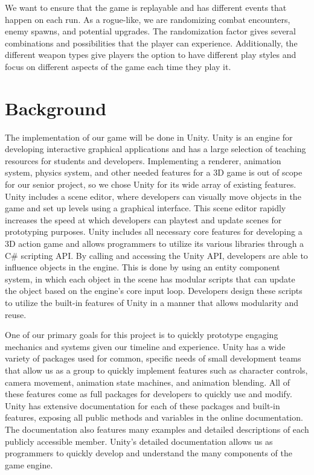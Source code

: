 \documentclass[12pt]{article}
\begin{document}
We want to ensure that the game is replayable and has different events that happen on each run. As a rogue-like, we are randomizing combat encounters, enemy spawns, and potential upgrades. The randomization factor gives several combinations and possibilities that the player can experience. Additionally, the different weapon types give players the option to have different play styles and focus on different aspects of the game each time they play it.


\section{Background}

The implementation of our game will be done in Unity. Unity is an engine for developing interactive graphical applications and has a large selection of teaching resources for students and developers. Implementing a renderer, animation system, physics system, and other needed features for a 3D game is out of scope for our senior project, so we chose Unity for its wide array of existing features. Unity includes a scene editor, where developers can visually move objects in the game and set up levels using a graphical interface. This scene editor rapidly increases the speed at which developers can playtest and update scenes for prototyping purposes. Unity includes all necessary core features for developing a 3D action game and allows programmers to utilize its various libraries through a C\# scripting API. By calling and accessing the Unity API, developers are able to influence objects in the engine. This is done by using an entity component system, in which each object in the scene has modular scripts that can update the object based on the engine's core input loop. Developers design these scripts to utilize the built-in features of Unity in a manner that allows modularity and reuse.

One of our primary goals for this project is to quickly prototype engaging mechanics and systems given our timeline and experience. Unity has a wide variety of packages used for common, specific needs of small development teams that allow us as a group to quickly implement features such as character controls, camera movement, animation state machines, and animation blending. All of these features come as full packages for developers to quickly use and modify. Unity has extensive documentation for each of these packages and built-in features, exposing all public methods and variables in the online documentation. The documentation also features many examples and detailed descriptions of each publicly accessible member. Unity's detailed documentation allows us as programmers to quickly develop and understand the many components of the game engine.
\end{document}
